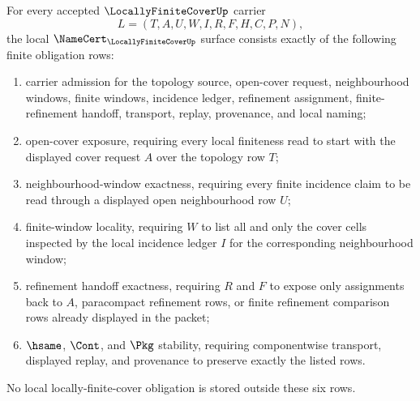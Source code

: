 \begin{theorem}
\label{thm:locally-finite-cover-namecert-obligations}
For every accepted $\LocallyFiniteCoverUp$ carrier
$$
L=(T,A,U,W,I,R,F,H,C,P,N),
$$
the local $\NameCert_{\LocallyFiniteCoverUp}$ surface consists exactly of the following finite obligation rows:
\begin{enumerate}
\item carrier admission for the topology source, open-cover request, neighbourhood windows, finite windows, incidence ledger, refinement assignment, finite-refinement handoff, transport, replay, provenance, and local naming;
\item open-cover exposure, requiring every local finiteness read to start with the displayed cover request $A$ over the topology row $T$;
\item neighbourhood-window exactness, requiring every finite incidence claim to be read through a displayed open neighbourhood row $U$;
\item finite-window locality, requiring $W$ to list all and only the cover cells inspected by the local incidence ledger $I$ for the corresponding neighbourhood window;
\item refinement handoff exactness, requiring $R$ and $F$ to expose only assignments back to $A$, paracompact refinement rows, or finite refinement comparison rows already displayed in the packet;
\item $\hsame$, $\Cont$, and $\Pkg$ stability, requiring componentwise transport, displayed replay, and provenance to preserve exactly the listed rows.
\end{enumerate}
No local locally-finite-cover obligation is stored outside these six rows.
\end{theorem}
